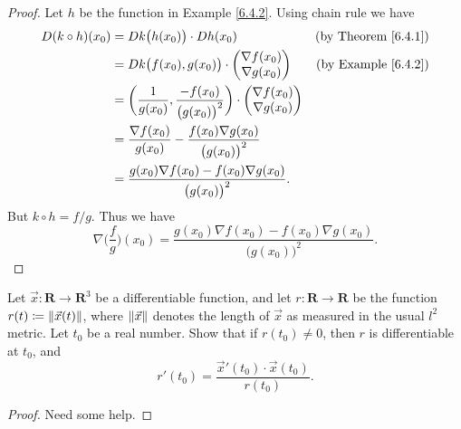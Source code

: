 \begin{proof}
    Let \(h\) be the function in Example \ref{6.4.2}.
    Using chain rule we have
    \begin{align*}
        D (k \circ h)(x_0) & = D k\big(h(x_0)\big) \cdot D h(x_0)                                                                & \text{(by Theorem \ref{6.4.1})} \\
                           & = D k\big(f(x_0), g(x_0)\big) \cdot \begin{pmatrix}
            \nabla f(x_0) \\
            \nabla g(x_0)
        \end{pmatrix}                                      & \text{(by Example \ref{6.4.2})} \\
                           & = \bigg(\frac{1}{g(x_0)}, \frac{-f(x_0)}{\big(g(x_0)\big)^2}\bigg) \cdot \begin{pmatrix}
            \nabla f(x_0) \\
            \nabla g(x_0)
        \end{pmatrix}                                   \\
                           & = \frac{\nabla f(x_0)}{g(x_0)} - \frac{f(x_0) \nabla g(x_0)}{\big(g(x_0)\big)^2}                                                      \\
                           & = \frac{g(x_0) \nabla f(x_0) - f(x_0) \nabla g(x_0)}{\big(g(x_0)\big)^2}.
    \end{align*}
    But \(k \circ h = f / g\).
    Thus we have
    \[
        \nabla \bigg(\frac{f}{g}\bigg)(x_0) = \frac{g(x_0) \nabla f(x_0) - f(x_0) \nabla g(x_0)}{\big(g(x_0)\big)^2}.
    \]
\end{proof}

\begin{exercise}\label{ex 6.4.5}
    Let \(\vec{x} : \mathbf{R} \to \mathbf{R}^3\) be a differentiable function, and let \(r : \mathbf{R} \to \mathbf{R}\) be the function \(r(t) \coloneqq \norm*{\vec{x}(t)}\), where \(\norm*{\vec{x}}\) denotes the length of \(\vec{x}\) as measured in the usual \(l^2\) metric.
    Let \(t_0\) be a real number.
    Show that if \(r(t_0) \neq 0\), then \(r\) is differentiable at \(t_0\), and
    \[
        r'(t_0) = \frac{\vec{x}'(t_0) \cdot \vec{x}(t_0)}{r(t_0)}.
    \]
\end{exercise}

\begin{proof}
    Need some help.
\end{proof}